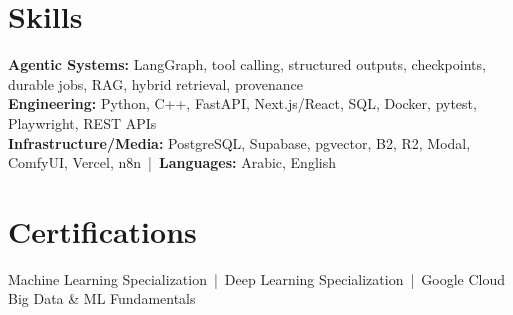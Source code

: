 \documentclass[letterpaper]{article}
\begin{document}
\section*{Skills}
\textbf{Agentic Systems:} LangGraph, tool calling, structured outputs, checkpoints, durable jobs, RAG, hybrid retrieval, provenance\\
\textbf{Engineering:} Python, C++, FastAPI, Next.js/React, SQL, Docker, pytest, Playwright, REST APIs\\
\textbf{Infrastructure/Media:} PostgreSQL, Supabase, pgvector, B2, R2, Modal, ComfyUI, Vercel, n8n \,|\, \textbf{Languages:} Arabic, English

\section*{Certifications}
Machine Learning Specialization \,|\, Deep Learning Specialization \,|\, Google Cloud Big Data \& ML Fundamentals
\end{document}
